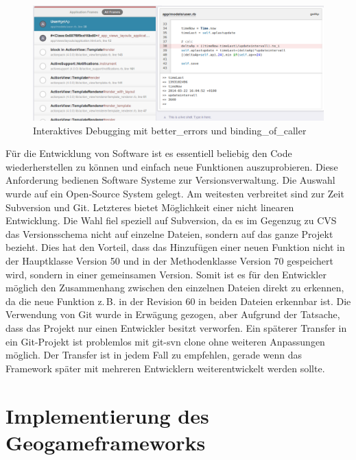 \begin{figure}[H]
\begin{center}
\includegraphics[width=155mm]{images/ch5_img08_livebinding.png}
\caption{Interaktives Debugging mit \glqq better\_errors\grqq{} und \glqq binding\_of\_caller\grqq{}}
\label{img:ch5_img08_livebinding}
\end{center}
\end{figure}

Für die Entwicklung von Software ist es essentiell beliebig den Code wiederherstellen zu können und einfach neue Funktionen auszuprobieren. Diese Anforderung bedienen Software Systeme zur Versionsverwaltung. 
Die Auswahl wurde auf ein Open-Source System gelegt. Am weitesten verbreitet sind zur Zeit Subversion und Git. Letzteres bietet Möglichkeit einer nicht linearen Entwicklung.\cite{Bird.2009}
Die Wahl fiel speziell auf Subversion, da es im Gegenzug zu CVS das Versionsschema nicht auf einzelne Dateien, sondern auf das ganze Projekt bezieht.
Dies hat den Vorteil, dass das Hinzufügen einer neuen Funktion nicht in der Hauptklasse Version 50 und in der Methodenklasse Version 70 gespeichert wird, sondern in einer gemeinsamen Version.
Somit ist es für den Entwickler möglich den Zusammenhang zwischen den einzelnen Dateien direkt zu erkennen, da die neue Funktion z.\,B. in der Revision 60 in beiden Dateien erkennbar ist.
Die Verwendung von Git wurde in Erwägung gezogen, aber Aufgrund der Tatsache, dass das Projekt nur einen Entwickler besitzt verworfen.  Ein späterer Transfer in ein Git-Projekt ist problemlos mit \glqq git-svn clone\grqq{} ohne weiteren Anpassungen möglich. Der Transfer ist in jedem Fall zu empfehlen, gerade wenn das Framework später mit mehreren Entwicklern weiterentwickelt werden sollte.

\section{Implementierung des Geogameframeworks}
\label{ch5:s:Implementierung}


